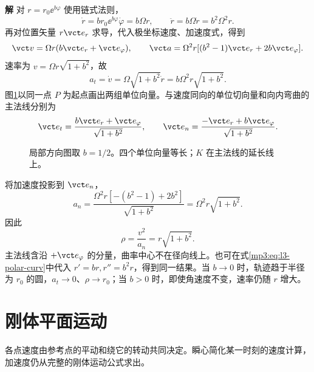 \documentclass[11pt,openany,fontset=fandol]{ctexbook}
\theoremstyle{definition}\newtheorem{example}{例}[chapter]\newtheorem{exercise}{习题}[chapter]
\newcommand{\SolutionStart}{\par\medskip\ifdim\pagetotal>0pt\ifdim\dimexpr\pagegoal-\pagetotal\relax<3\baselineskip\newpage\fi\fi\noindent\textbf{解}\quad\ignorespaces}
\newenvironment{solution}{\SolutionStart}{\par\medskip}
\begin{document}
\begin{solution}
对 $r=r_0\ee^{b\varphi}$ 使用链式法则，
\[
\dot r=br_0\ee^{b\varphi}\dot\varphi=b\Omega r,
\qquad \ddot r=b\Omega\dot r=b^2\Omega^2r.
\]
再对位置矢量 $r\vct e_r$ 求导，代入极坐标速度、加速度式，得到
\[
\vct v=\Omega r(b\vct e_r+\vct e_\varphi),\qquad
\vct a=\Omega^2r[(b^2-1)\vct e_r+2b\vct e_\varphi].
\]
速率为 $v=\Omega r\sqrt{1+b^2}$，故
\[
a_t=\dot v=\Omega\sqrt{1+b^2}\dot r
=b\Omega^2r\sqrt{1+b^2}.
\]
图\ref{mp3:fig:l3-e3-s}以同一点 $P$ 为起点画出两组单位向量。与速度同向的单位切向量和向内弯曲的主法线分别为
\[
\vct e_t=\frac{b\vct e_r+\vct e_\varphi}{\sqrt{1+b^2}},
\qquad
\vct e_n=\frac{-\vct e_r+b\vct e_\varphi}{\sqrt{1+b^2}}.
\]

\begin{figure}[H]\centering
{}
\caption{局部方向图取 $b=1/2$。四个单位向量等长；$K$ 在主法线的延长线上。}\label{mp3:fig:l3-e3-s}
\end{figure}


将加速度投影到 $\vct e_n$，
\[
a_n=\frac{\Omega^2r[-(b^2-1)+2b^2]}{\sqrt{1+b^2}}
=\Omega^2r\sqrt{1+b^2}.
\]
因此
\[
\rho=\frac{v^2}{a_n}=r\sqrt{1+b^2}.
\]
主法线含沿 $+\vct e_\varphi$ 的分量，曲率中心不在径向线上。也可在式\eqref{mp3:eq:l3-polar-curv}中代入 $r'=br,r''=b^2r$，得到同一结果。当 $b\to0$ 时，轨迹趋于半径为 $r_0$ 的圆，$a_t\to0$、$\rho\to r_0$；当 $b>0$ 时，即使角速度不变，速率仍随 $r$ 增大。

\end{solution}

\section{刚体平面运动}
各点速度由参考点的平动和绕它的转动共同决定。瞬心简化某一时刻的速度计算，加速度仍从完整的刚体运动公式求出。
\end{document}
